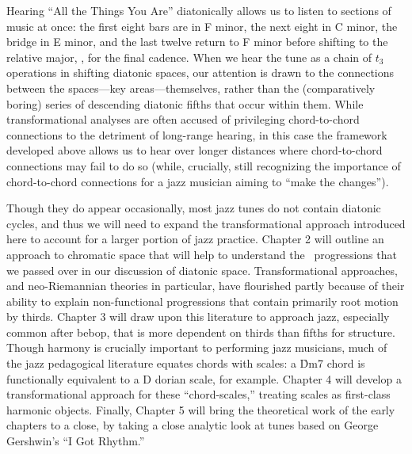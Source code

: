 Hearing “All the Things You Are” diatonically allows us to listen to sections
of music at once: the first eight bars are in F minor, the next eight in C
minor, the bridge in E minor, and the last twelve return to F minor before
shifting to the relative major, \Aflat, for the final cadence. When we hear
the tune as a chain of $t_3$ operations in shifting diatonic spaces, our
attention is drawn to the connections between the spaces---key
areas---themselves, rather than the (comparatively boring) series of
descending diatonic fifths that occur within them.  While transformational
analyses are often accused of privileging chord-to-chord connections to the
detriment of long-range hearing, in this case the \gis{} framework developed
above allows us to hear over longer distances where chord-to-chord connections
may fail to do so (while, crucially, still recognizing the importance of
chord-to-chord connections for a jazz musician aiming to “make the changes”).


Though they do appear occasionally, most jazz tunes do not contain diatonic
cycles, and thus we will need to expand the transformational approach
introduced here to account for a larger portion of jazz practice. Chapter 2
will outline an approach to chromatic space that will help to understand the
\tfo\ progressions that we passed over in our discussion of diatonic space.
Transformational approaches, and neo-Riemannian theories in particular, have
flourished partly because of their ability to explain non-functional
progressions that contain primarily root motion by thirds. Chapter 3 will
draw upon this literature to approach jazz, especially common after
bebop, that is more dependent on thirds than fifths for structure. Though
harmony is crucially important to performing jazz musicians, much of the jazz
pedagogical literature equates chords with scales: a \h{Dm7} chord is
functionally equivalent to a D dorian scale, for example. Chapter 4 will
develop a transformational approach for these “chord-scales,” treating scales
as first-class harmonic objects. Finally, Chapter 5 will bring the theoretical
work of the early chapters to a close, by taking a close analytic look at
tunes based on George Gershwin’s “I Got Rhythm.”





